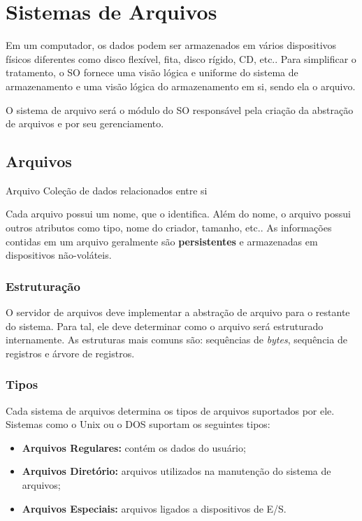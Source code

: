 \chapter{Sistemas de Arquivos}
Em um computador, os dados podem ser armazenados em vários dispositivos físicos diferentes como disco flexível, fita, disco rígido, CD, etc.. Para simplificar o tratamento, o SO fornece uma visão lógica e uniforme do sistema de armazenamento e uma visão lógica do armazenamento em si, sendo ela o arquivo.

O sistema de arquivo será o módulo do SO responsável pela criação da abstração de arquivos e por seu gerenciamento.

\section{Arquivos}

\begin{definicao}{Arquivo}
  Coleção de dados relacionados entre si
\end{definicao}

Cada arquivo possui um nome, que o identifica. Além do nome, o arquivo possui outros atributos como tipo, nome do criador, tamanho, etc.. As informações contidas em um arquivo geralmente são \textbf{persistentes} e armazenadas em dispositivos não-voláteis.

\subsection{Estruturação}
O servidor de arquivos deve implementar a abstração de arquivo para o restante do sistema. Para tal, ele deve determinar como o arquivo será estruturado internamente. As estruturas mais comuns são: sequências de \textit{bytes}, sequência de registros e árvore de registros.


\subsection{Tipos}
Cada sistema de arquivos determina os tipos de arquivos suportados por ele. Sistemas como o Unix ou o DOS suportam os seguintes tipos:

\begin{itemize}
  \item \textbf{Arquivos Regulares:} contém os dados do usuário;
  \item \textbf{Arquivos Diretório:} arquivos utilizados na manutenção do sistema de arquivos;
  \item \textbf{Arquivos Especiais:} arquivos ligados a dispositivos de E/S.
\end{itemize}


